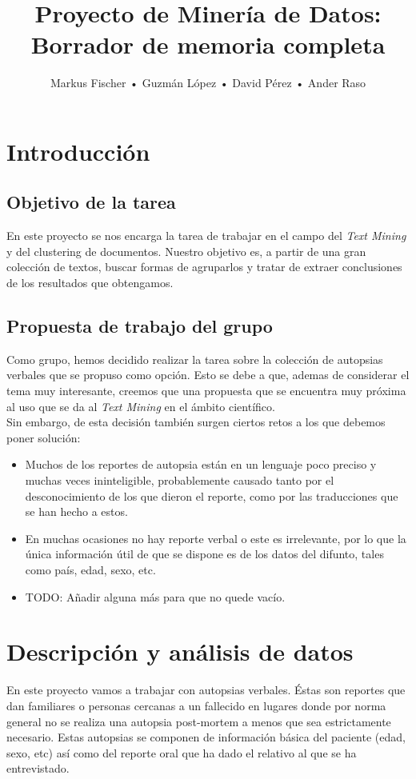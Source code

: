 \documentclass[10pt,a4paper,draft]{article}
\author{Markus Fischer • Guzmán López • David Pérez • Ander Raso}
\title{Proyecto de Minería de Datos: \linebreak Borrador de memoria completa}
\date{}
\begin{document}
\maketitle

\section{Introducción}
	\subsection{Objetivo de la tarea}
	En este proyecto se nos encarga la tarea de trabajar en el campo del \textit{Text Mining} y del clustering de documentos. Nuestro objetivo es, a partir de una gran colección de textos, buscar formas de agruparlos y tratar de extraer conclusiones de los resultados que obtengamos.
	\subsection{Propuesta de trabajo del grupo}
	Como grupo, hemos decidido realizar la tarea sobre la colección de autopsias verbales que se propuso como opción. Esto se debe a que, ademas de considerar el tema muy interesante, creemos que  una propuesta que se encuentra muy próxima al uso que se da al \textit{Text Mining} en el ámbito científico.\\
	
	Sin embargo, de esta decisión también surgen ciertos retos a los que debemos poner solución:
	\begin{itemize}
	\item Muchos de los reportes de autopsia están en un lenguaje poco preciso y muchas veces ininteligible, probablemente causado tanto por el desconocimiento de los que dieron el reporte, como por las traducciones que se han hecho a estos.
	\item En muchas ocasiones no hay reporte verbal o este es irrelevante, por lo que la única información útil de que se dispone es de los datos del difunto, tales como país, edad, sexo, etc.
	\item TODO: Añadir alguna más para que no quede vacío.
	\end{itemize}

\section{Descripción y análisis de datos}
En este proyecto vamos a trabajar con autopsias verbales. Éstas son reportes que dan familiares o personas cercanas a un fallecido en lugares donde por norma general no se realiza una autopsia post-mortem a menos que sea estrictamente necesario. Estas autopsias se componen de información básica del paciente (edad, sexo, etc) así como del reporte oral que ha dado el relativo al que se ha entrevistado.\\
\end{document}
